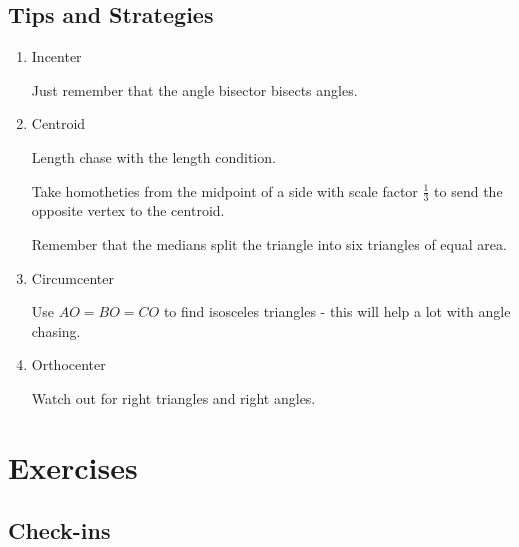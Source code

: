 \subsection{Tips and Strategies}

\begin{enumerate}
\item Incenter
\begin{itemize}
\Item Just remember that the angle bisector bisects angles.
\end{itemize}

\item Centroid
\begin{itemize}
\Item Length chase with the length condition.

\Item Take homotheties from the midpoint of a side with scale factor $\frac{1}{3}$ to send the opposite vertex to the centroid.

\Item Remember that the medians split the triangle into six triangles of equal area.
\end{itemize}

\item Circumcenter
\begin{itemize}
\Item Use $AO=BO=CO$ to find isosceles triangles - this will help a lot with angle chasing.
\end{itemize}

\item Orthocenter
\begin{itemize}
\Item Watch out for right triangles and right angles.
\end{itemize}
\end{enumerate}

\pagebreak

\section{Exercises}

\subsection{Check-ins}

